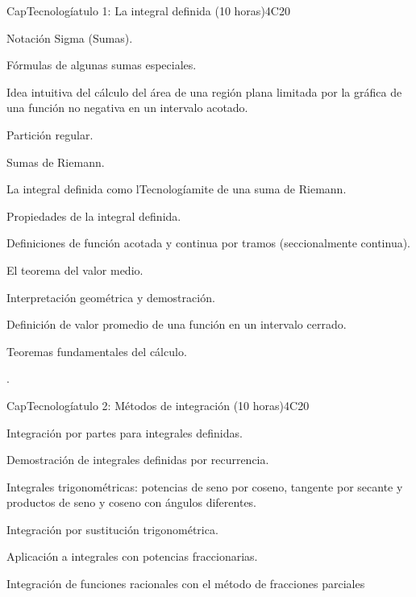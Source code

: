\begin{syllabus}
\begin{unit}{CapTecnologíatulo 1: La integral definida (10 horas)}{}{}{4}{C20}
\begin{topics}
      \item Notación Sigma (Sumas). 
      \item Fórmulas de algunas sumas especiales.
      \item Idea intuitiva del cálculo del área de una región plana limitada por la gráfica de una función no negativa en un intervalo acotado.
      \item Partición regular.
      \item Sumas de Riemann.
      \item La integral definida como lTecnologíamite de una suma de Riemann. 
      \item Propiedades de la integral definida.
      \item Definiciones de función acotada y continua por tramos (seccionalmente continua).
      \item El teorema del valor medio.
      \item Interpretación geométrica y demostración. 
      \item Definición de valor promedio de una función en un intervalo cerrado.
      \item Teoremas fundamentales del cálculo.      
   \end{topics}

   \begin{learningoutcomes}
      \item .
   \end{learningoutcomes}
\end{unit}

\begin{unit}{CapTecnologíatulo 2: Métodos de integración (10 horas)}{}{}{4}{C20}


\begin{topics}
      \item Integración por partes para integrales definidas.
      \item Demostración de integrales definidas por recurrencia. 
      \item Integrales trigonométricas: potencias de seno por coseno, tangente por secante y productos de seno y coseno con ángulos diferentes.
      \item Integración por sustitución trigonométrica. 
      \item Aplicación a integrales con potencias fraccionarias.
      \item Integración de funciones racionales con el método de fracciones parciales
   \end{topics}
\end{unit}


\end{syllabus}
